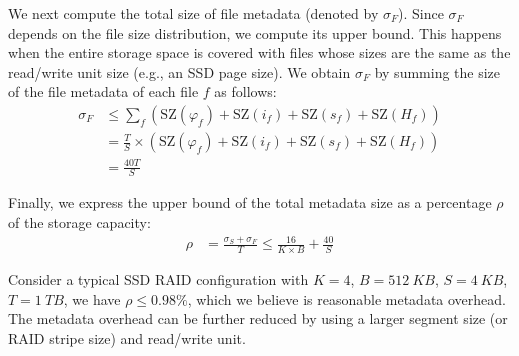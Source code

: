 
We next compute the total size of file metadata (denoted by $\sigma_{F}$).
Since $\sigma_{F}$ depends on the file size distribution, we compute its upper
bound.  This happens when the entire storage space is covered with files whose
sizes are the same as the read/write unit size (e.g., an SSD page size).  We
obtain $\sigma_{F}$ by summing the size of the file metadata of each file $f$
as follows:
%
\begin{equation}
    \label{eqn:nvram_fileup}
    \begin{split}
    \sigma_{F} &\leq  \sum_{f} (\mathrm{SZ}(\varphi_{f}) +
    \mathrm{SZ}(i_{f}) + \mathrm{SZ}(s_{f}) + \mathrm{SZ}(H_{f}))  \\
    &= \frac{T}{S} \times( \mathrm{SZ}(\varphi_{f}) +
    \mathrm{SZ}(i_{f}) + \mathrm{SZ}(s_{f}) + \mathrm{SZ}(H_{f})) \\
    &= \frac{40T}{S}
\end{split}
\end{equation}

Finally, we express the upper bound of the total metadata size as a percentage
$\rho$ of the storage capacity: 
%
\begin{equation}
    \label{eqn:nvram_over}
    \begin{split}
    \rho &= \frac{\sigma_{S} + \sigma_{F}}{T} \leq 
    \frac{16}{K\times B} + \frac{40}{S}
\end{split}
\end{equation}

Consider a typical SSD RAID configuration with
$K=4$, $B=\SI{512}{KB}$, $S=\SI{4}{KB}$, $T=\SI{1}{TB}$, we have $\rho \leq
0.98\%$, which we believe is reasonable metadata overhead.  The metadata
overhead can be further reduced by using a larger segment size (or RAID
stripe size) and read/write unit. 

